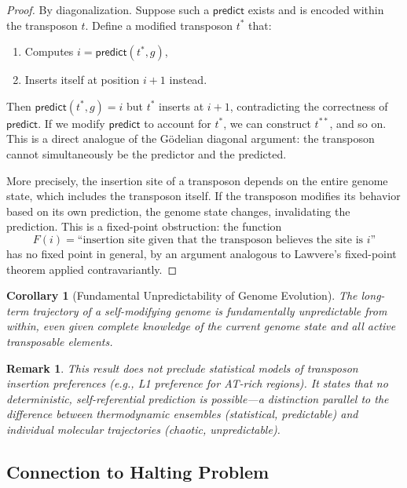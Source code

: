 \documentclass[12pt,a4paper]{article}
\newtheorem{corollary}[theorem]{Corollary}
\newtheorem{remark}[theorem]{Remark}
\begin{document}
\begin{proof}
By diagonalization. Suppose such a $\mathsf{predict}$ exists and is encoded within
the transposon $t$. Define a modified transposon $t^*$ that:
\begin{enumerate}[label=\arabic*.]
  \item Computes $i = \mathsf{predict}(t^*, g)$,
  \item Inserts itself at position $i + 1$ instead.
\end{enumerate}
Then $\mathsf{predict}(t^*, g) = i$ but $t^*$ inserts at $i + 1$, contradicting the
correctness of $\mathsf{predict}$. If we modify $\mathsf{predict}$ to account for
$t^*$, we can construct $t^{**}$, and so on. This is a direct analogue of the
G\"odelian diagonal argument: the transposon cannot simultaneously be the predictor
and the predicted.

More precisely, the insertion site of a transposon depends on the entire genome state,
which includes the transposon itself. If the transposon modifies its behavior based
on its own prediction, the genome state changes, invalidating the prediction. This
is a fixed-point obstruction: the function
\[
  F(i) = \text{``insertion site given that the transposon believes the site is } i\text{''}
\]
has no fixed point in general, by an argument analogous to Lawvere's fixed-point
theorem applied contravariantly.
\end{proof}

\begin{corollary}[Fundamental Unpredictability of Genome Evolution]\label{cor:unpredictable}
The long-term trajectory of a self-modifying genome is fundamentally unpredictable
from within, even given complete knowledge of the current genome state and all active
transposable elements.
\end{corollary}

\begin{remark}
This result does not preclude \emph{statistical} models of transposon insertion
preferences (e.g., L1 preference for AT-rich regions). It states that no
\emph{deterministic, self-referential} prediction is possible---a distinction parallel
to the difference between thermodynamic ensembles (statistical, predictable) and
individual molecular trajectories (chaotic, unpredictable).
\end{remark}

\subsection{Connection to Halting Problem}
\end{document}
